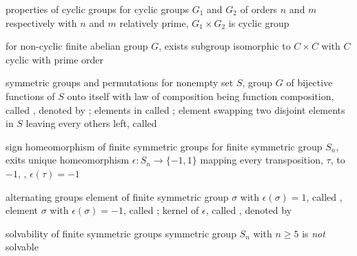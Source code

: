 \documentclass[17pt,landscape]{foils}
\begin{document}
{\begin{myproposition}{properties of cyclic groups}
	\iitem
		for cyclic groups $G_1$ and $G_2$ of orders $n$ and $m$ respectively
		with $n$ and $m$ relatively prime,
		$G_1\times G_2$ is cyclic group

	\iitem
		for non-cyclic finite abelian group $G$,
		exists subgroup isomorphic to $C\times C$
		with $C$ cyclic with prime order
	\eit
\end{myproposition}



\begin{mydefinition}{symmetric groups and permutations}%
	for nonempty set $S$, group $G$ of bijective functions of $S$ onto itself
	with law of composition being function composition,
	called , denoted by ;
	elements in  called ;
	element swapping two disjoint elements in $S$ leaving every others left,
	called %
\end{mydefinition}

\begin{myproposition}{sign homeomorphism of finite symmetric groups}
	for finite symmetric group $S_n$,
	exits unique homeomorphism $\epsilon: S_n \to\{-1,1\}$
	mapping every transposition, $\tau$, to $-1$,
	\ie, $\epsilon(\tau)=-1$
\end{myproposition}
%

\begin{mydefinition}{alternating groups}%
	element of finite symmetric group $\sigma$ with $\epsilon(\sigma)=1$,
	called ,
	element $\sigma$ with $\epsilon(\sigma)=-1$,
	called ;
	kernel of $\epsilon$, called , denoted by %
\end{mydefinition}

\begin{mytheorem}{solvability of finite symmetric groups}
	symmetric group $S_n$ with $n\geq 5$
	is \emph{not} solvable
\end{mytheorem}

}
\end{document}
